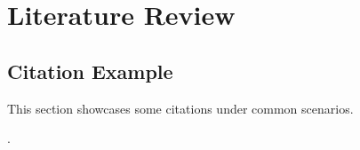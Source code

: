 \chapter{Literature Review}
\label{c:lit}

\section{Citation Example}
\label{s:citation}

This section showcases some citations under common scenarios.

\cite{bonica:ajps2014,donoho:wp2015,meyersson:e2014,akerlof:qje2000,bond:apsr2015,broockman:s2016,nunn:aer2011,gentzkow:2017,hastie:2009,chetty:2017,national-opinion-research-center:2017,pew-research-center:2016b,the-new-york-times:2016}.
